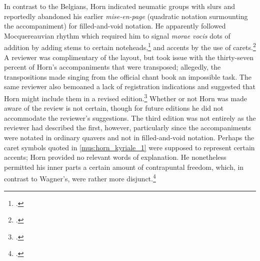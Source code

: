 In contrast to the Belgians, Horn indicated neumatic groups with slurs and reportedly abandoned his earlier \emph{mise-en-page} (quadratic notation surmounting the accompaniment) for filled-and-void notation.
He apparently followed Mocquereauvian rhythm which required him to signal \emph{morae vocis} dots of addition by adding stems to certain noteheads,\footcite[14:116--117]{Bibliographiegregorienneeditions1906a} and accents by the use of carets.\footnote{\covid{}\cite{HornOrganumcomitansKyriale1906}.}
A reviewer was complimentary of the layout, but took issue with the thirty-seven percent of Horn's accompaniments that were transposed; allegedly, the transpositions made singing from the official chant book an impossible task.
The same reviewer also bemoaned a lack of registration indications and suggested that Horn might include them in a revised edition.\footcite[cols 245--6]{MantuaniKunstundKunstgeschichte1906}
Whether or not Horn was made aware of the review is not certain, though for future editions he did not accommodate the reviewer's suggestions.
The third edition was not entirely as the reviewer had described the first, however, particularly since the accompaniments were notated in ordinary quavers and not in filled-and-void notation.
Perhaps the caret symbols quoted in \cref{mus:horn_kyriale_1} were supposed to represent certain accents; Horn provided no relevant words of explanation.
He nonetheless permitted his inner parts a certain amount of contrapuntal freedom, which, in contrast to Wagner's, were rather more disjunct.\footcite[1]{HornOrganumcomitansKyriale1932}

